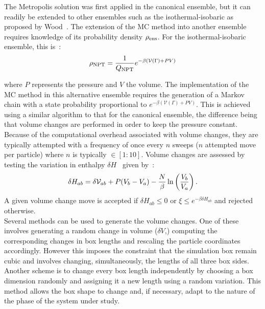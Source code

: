 The Metropolis solution was first applied in the canonical ensemble, but it can
readily be extended to other ensembles such as the isothermal-isobaric as proposed by
Wood~\cite{Wood68}. The extension of the MC method into another ensemble requires knowledge of
its probability density $\rho_{\mathrm{ens}}$. For the isothermal-isobaric 
ensemble, this is~:
\begin{eqnarray}
	\rho_{\mathrm{NPT}} = \frac{1}{Q_{\mathrm{NPT}}}e^{-\beta(\mathcal{V}(\Gamma) +PV )}
\end{eqnarray}

where $P$ represents the pressure and $V$ the volume.
The implementation of the MC method in this alternative ensemble requires the generation of a Markov
chain with a state probability proportional to $e^{-\beta(\mathcal{V}(\Gamma) +PV )}$.
This is achieved using a similar algorithm to that for the canonical
ensemble, the difference being that volume changes are performed in order to keep the pressure
constant. Because of the computational
overhead associated with volume changes, they are typically attempted with a frequency of 
once every $n$ sweeps (\ie $n$ attempted move per particle) where $n$ is typically 
$\in [1:10]$. Volume changes are assessed by testing the variation in enthalpy 
$\delta H$~\cite{AandT} given by~:
\begin{equation}
	\delta H_{ab} = \delta\mathcal{V}_{ab} + P(V_b - V_a)-\frac{N}{\beta}\ln\left(\frac{V_b}{V_a}\right).
\end{equation}
%
A given volume change move is accepted if $\delta H_{ab} \leq 0$ or 
$\xi \leq e^{-\beta \delta H_{ab}}$ and rejected otherwise.\\

Several methods can be used to generate the volume changes. One of these involves generating a random
change in volume ($\delta V$,) computing the corresponding changes in box lengths and
rescaling the particle coordinates accordingly. However this imposes the constraint that
the simulation box remain cubic and involves changing, simultaneously, the lengths of all three
box sides. Another scheme is to change every box length independently
by choosing a box dimension randomly and assigning it a new length using a random variation. 
This method allows the box shape to change and, if necessary, adapt to the nature of the phase of 
the system under study. 


